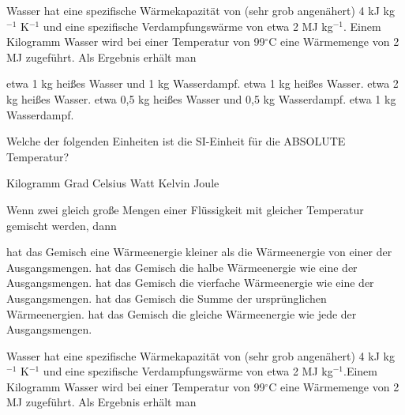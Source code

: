 \documentclass[11pt]{exam}
\begin{document}
\setlength{\voffset}{-0.5in}
\setlength{\headsep}{5pt}

\hspace{2mm}
 \hspace{5mm}
\vspace{4mm}

\begin{questions}

\question Wasser hat eine spezifische Wärmekapazität von (sehr grob angenähert) 4 kJ kg\(^{-1}\) K\(^{-1}\) und eine spezifische Verdampfungswärme von etwa 2 MJ kg\(^{-1}\). Einem Kilogramm Wasser wird bei einer Temperatur von 99\(^\circ\)C eine Wärmemenge von 2 MJ zugeführt. Als Ergebnis erhält man

\begin{choices}
	\choice etwa 1 kg heißes Wasser und 1 kg Wasserdampf.
	\choice etwa 1 kg heißes Wasser.
	\choice etwa 2 kg heißes Wasser.
	\choice etwa 0,5 kg heißes Wasser und 0,5 kg Wasserdampf.
	\choice etwa 1 kg Wasserdampf.
\end{choices}

\vspace{3mm}\question Welche der folgenden Einheiten ist die SI-Einheit für die ABSOLUTE Temperatur?

\begin{choices}
	\choice Kilogramm
	\choice Grad Celsius
	\choice Watt
	\choice Kelvin
	\choice Joule
\end{choices}

\vspace{3mm}\question Wenn zwei gleich große Mengen einer Flüssigkeit mit gleicher Temperatur gemischt werden, dann

\begin{choices}
	\choice hat das Gemisch eine Wärmeenergie kleiner als die Wärmeenergie von einer der Ausgangsmengen.
	\choice hat das Gemisch die halbe Wärmeenergie wie eine der Ausgangsmengen.
	\choice hat das Gemisch die vierfache Wärmeenergie wie eine der Ausgangsmengen.
	\choice hat das Gemisch die Summe der ursprünglichen Wärmeenergien.
	\choice hat das Gemisch die gleiche Wärmeenergie wie jede der Ausgangsmengen.
\end{choices}

\vspace{3mm}\question Wasser hat eine spezifische Wärmekapazität von (sehr grob angenähert) 4 kJ kg\(^{-1}\) K\(^{-1}\) und eine spezifische Verdampfungswärme von etwa 2 MJ kg\(^{-1}\).Einem Kilogramm Wasser wird bei einer Temperatur von 99\(^\circ\)C eine Wärmemenge von 2 MJ zugeführt. Als Ergebnis erhält man


\end{questions}
\end{document}

